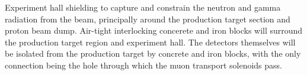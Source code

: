 {}
{}
{\phaseI}
{Experiment hall shielding to capture and constrain the neutron and gamma radiation from the beam, principally around the production target section and proton beam dump.  Air-tight interlocking concerete and iron blocks will surround the production target region and experiment hall.  The detectors themselves will be isolated from the production target by concrete and iron blocks, with the only connection being the hole through which the muon transport solenoids pass. }
{}
